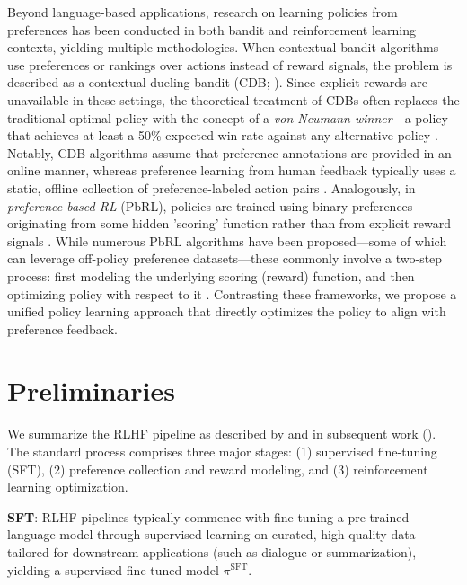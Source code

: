 Beyond language-based applications, research on learning policies from preferences has been conducted in both bandit and reinforcement learning contexts, yielding multiple methodologies. When contextual bandit algorithms use preferences or rankings over actions instead of reward signals, the problem is described as a contextual dueling bandit (CDB; \cite{yue2012karmed,dudik2015contextual}). Since explicit rewards are unavailable in these settings, the theoretical treatment of CDBs often replaces the traditional optimal policy with the concept of a \textit{von Neumann winner}—a policy that achieves at least a 50\% expected win rate against any alternative policy \citep{dudik2015contextual}. Notably, CDB algorithms assume that preference annotations are provided in an online manner, whereas preference learning from human feedback typically uses a static, offline collection of preference-labeled action pairs \citep{yan2022human}. Analogously, in \textit{preference-based RL} (PbRL), policies are trained using binary preferences originating from some hidden 'scoring' function rather than from explicit reward signals \citep{BusaFekete2014,ruiz2023dueling}. While numerous PbRL algorithms have been proposed—some of which can leverage off-policy preference datasets—these commonly involve a two-step process: first modeling the underlying scoring (reward) function, and then optimizing policy with respect to it \citep{jain2013learning,BusaFekete2014,christiano2017deep,sadigh2017active,kupcsik2018learning}. Contrasting these frameworks, we propose a unified policy learning approach that directly optimizes the policy to align with preference feedback.

\section{Preliminaries}\label{section:prelims}

We summarize the RLHF pipeline as described by \citeauthor{ziegler2020finetuning} and in subsequent work (\citep{stiennon2022learning, bai2022training, ouyang2022training}). The standard process comprises three major stages: (1) supervised fine-tuning (SFT), (2) preference collection and reward modeling, and (3) reinforcement learning optimization.

\textbf{SFT}: RLHF pipelines typically commence with fine-tuning a pre-trained language model through supervised learning on curated, high-quality data tailored for downstream applications (such as dialogue or summarization), yielding a supervised fine-tuned model $\pi^\text{SFT}$.

